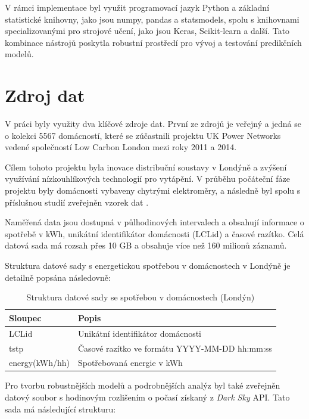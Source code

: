 \documentclass[FM,BP,fonts]{tulthesis}
\begin{document}
V rámci implementace byl využit programovací jazyk Python a základní statistické knihovny, jako jsou numpy, pandas a statsmodels, spolu s knihovnami specializovanými pro strojové učení, jako jsou Keras, Scikit-learn a další. Tato kombinace nástrojů poskytla robustní prostředí pro vývoj a testování predikčních modelů.

\newpage
\section{Zdroj dat}
V práci byly využity dva klíčové zdroje dat. První ze zdrojů je veřejný a jedná se o kolekci 5567 domácností, které se zúčastnili projektu UK Power Networks vedené společností Low Carbon London mezi roky 2011 a 2014. 

Cílem tohoto projektu byla inovace distribuční soustavy v Londýně a zvýšení využívání nízkouhlíkových technologií pro vytápění. V průběhu počáteční fáze projektu byly domácnosti vybaveny chytrými elektroměry, a následně byl spolu s příslušnou studií zveřejněn vzorek dat \cite{londondata}.

Naměřená data jsou dostupná v půlhodinových intervalech a obsahují informace o spotřebě v kWh, unikátní identifikátor domácnosti (LCLid) a časové razítko. Celá datová sada má rozsah přes 10 GB a obsahuje více než 160 milionů záznamů.

Struktura datové sady s energetickou spotřebou v domácnostech v Londýně je detailně popsána následovně:
 \renewcommand{\arraystretch}{1.1}
\begin{table}[!ht]
	\centering
	\caption{Struktura datové sady se spotřebou v domácnostech (Londýn)}
	\begin{tabularx}{\linewidth}{ll}
		\hline
		\textbf{Sloupec} & \textbf{Popis} \\ \hline
		LCLid & Unikátní identifikátor domácnosti \\ 
		tstp & Časové razítko ve formátu YYYY-MM-DD hh:mm:ss \\ 
		energy(kWh/hh) & Spotřebovaná energie v kWh \\ 
		\hline
	\end{tabularx}
\end{table}

Pro tvorbu robustnějších modelů a podrobnějších analýz byl také zveřejněn datový soubor s hodinovým rozlišením o počasí získaný z \textit{Dark Sky} API. Tato sada má následující strukturu:
\end{document}
